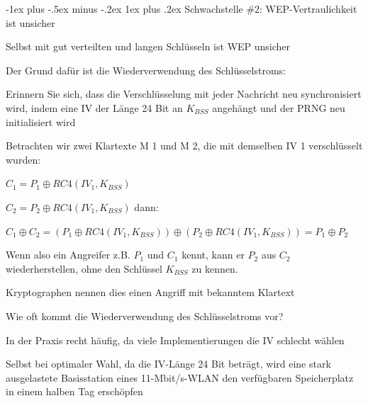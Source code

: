 \documentclass[a4paper]{article}
\makeatletter
\renewcommand{\subsubsection}{\@startsection{subsubsection}{3}{0mm}%
 {-1ex plus -.5ex minus -.2ex}%
 {1ex plus .2ex}%
 {\normalfont\small\bfseries}}
\makeatother
\begin{document}
\begin{multicols}{3}
      \subsubsection{Schwachstelle \#2: WEP-Vertraulichkeit ist unsicher}
      \begin{itemize*}
            \item Selbst mit gut verteilten und langen Schlüsseln ist WEP unsicher
            \item Der Grund dafür ist die Wiederverwendung des Schlüsselstroms:
            \begin{itemize*}
                  \item Erinnern Sie sich, dass die Verschlüsselung mit jeder Nachricht neu synchronisiert wird, indem eine IV der Länge 24 Bit an $K_{BSS}$ angehängt und der PRNG neu initialisiert wird
                  \item Betrachten wir zwei Klartexte M 1 und M 2, die mit demselben IV 1 verschlüsselt wurden:
                  \begin{itemize*}
                        \item $C_1 = P_1 \oplus RC4 (IV_1 , K_{BSS})$
                        \item $C_2 = P_2 \oplus RC4 (IV_1 , K_{BSS})$ dann:
                        \item $C_1 \oplus C_2 = (P_1 \oplus RC4 (IV_1, K_{BSS})) \oplus (P_2\oplus RC4 (IV_1 , K_{BSS})) = P_1 \oplus P_2$
                  \end{itemize*}
                  \item Wenn also ein Angreifer z.B. $P_1$ und $C_1$ kennt, kann er $P_2$ aus $C_2$ wiederherstellen, ohne den Schlüssel $K_{BSS}$ zu kennen.
                  \begin{itemize*}
                        \item Kryptographen nennen dies einen Angriff mit bekanntem Klartext
                  \end{itemize*}
            \end{itemize*}
            \item Wie oft kommt die Wiederverwendung des Schlüsselstroms vor?
            \begin{itemize*}
                  \item In der Praxis recht häufig, da viele Implementierungen die IV schlecht wählen
                  \item Selbst bei optimaler Wahl, da die IV-Länge 24 Bit beträgt, wird eine stark ausgelastete Basisstation eines 11-Mbit/s-WLAN den verfügbaren Speicherplatz in einem halben Tag erschöpfen
            \end{itemize*}
      \end{itemize*}


\end{multicols}
\end{document}
